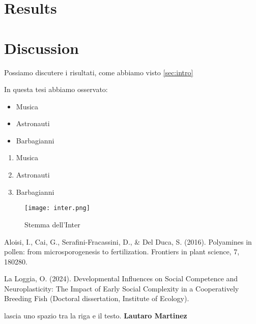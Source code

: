 \documentclass[12pt]{article}
\begin{document}
\section{Results}

\section{Discussion}
Possiamo discutere i risultati, come abbiamo visto \ref{sec:intro} %


In questa tesi abbiamo osservato:
\begin{itemize}
    \item Musica
    \item Astronauti
    \item Barbagianni
\end{itemize} %

\begin{enumerate} 
    \item Musica
    \item Astronauti
    \item Barbagianni
\end{enumerate}

\newpage %

\begin{figure}
    \centering %
    \texttt{[image: inter.png]} %
    \caption{Stemma dell'Inter} %
    \label{fig:chagall} %
\end{figure}

\newpage
\begin{thebibliography}{999} %
    
    Aloisi, I., Cai, G., Serafini-Fracassini, D., \& Del Duca, S. (2016). Polyamines in pollen: from microsporogenesis to fertilization. Frontiers in plant science, 7, 180280. %
    
    La Loggia, O. (2024). Developmental Influences on Social Competence and Neuroplasticity: The Impact of Early Social Complexity in a Cooperatively Breeding Fish (Doctoral dissertation, Institute of Ecology).

\end{thebibliography}

\newpage

\hline %
\bigskip
lascia uno spazio tra la riga e il testo.
\textbf{Lautaro Martinez}
\bigskip
\hline %
\end{document}
